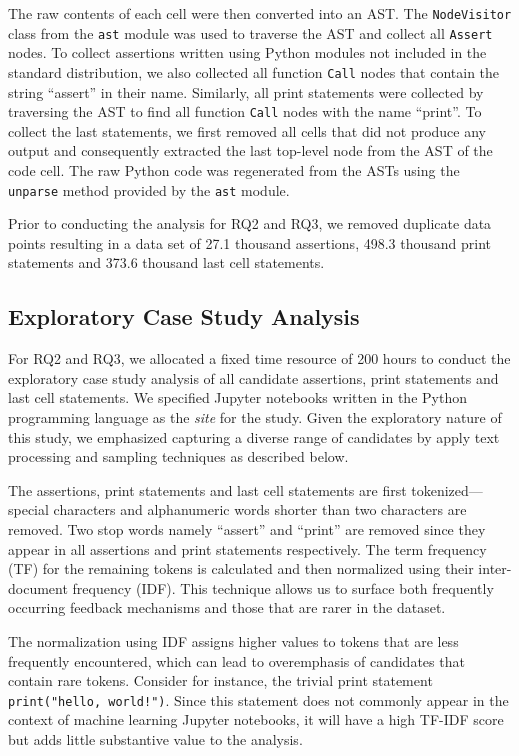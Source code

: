 \documentclass[smallextended]{svjour3}       %
\begin{document}
The raw contents of each cell were then converted into an AST. The \lstinline{NodeVisitor} class from the \lstinline{ast} module was used to traverse the AST and collect all \lstinline{Assert} nodes. To collect assertions written using Python modules not included in the standard distribution, we also collected all function \lstinline{Call} nodes that contain the string ``assert'' in their name. Similarly, all print statements were collected by traversing the AST to find all function \lstinline{Call} nodes with the name ``print''. To collect the last statements, we first removed all cells that did not produce any output and consequently extracted the last top-level node from the AST of the code cell. The raw Python code was regenerated from the ASTs using the \lstinline{unparse} method provided by the \lstinline{ast} module.

Prior to conducting the analysis for RQ2 and RQ3, we removed duplicate data points resulting in a data set of 27.1 thousand assertions, 498.3 thousand print statements and 373.6 thousand last cell statements.

\subsection{Exploratory Case Study Analysis}

For RQ2 and RQ3, we allocated a fixed time resource of 200 hours to conduct the exploratory case study analysis of all candidate assertions, print statements and last cell statements. We specified Jupyter notebooks written in the Python programming language as the \emph{site} for the study. Given the exploratory nature of this study, we emphasized capturing a diverse range of candidates by apply text processing and sampling techniques as described below.

The assertions, print statements and last cell statements are first tokenized---special characters and alphanumeric words shorter than two characters are removed. Two stop words namely ``assert'' and ``print'' are removed since they appear in all assertions and print statements respectively. The term frequency (TF) for the remaining tokens is calculated and then normalized using their inter-document frequency (IDF). This technique allows us to surface both frequently occurring feedback mechanisms and those that are rarer in the dataset.

The normalization using IDF assigns higher values to tokens that are less frequently encountered, which can lead to overemphasis of candidates that contain rare tokens. Consider for instance, the trivial print statement \lstinline{print("hello, world!")}. Since this statement does not commonly appear in the context of machine learning Jupyter notebooks, it will have a high TF-IDF score but adds little substantive value to the analysis.
\end{document}
